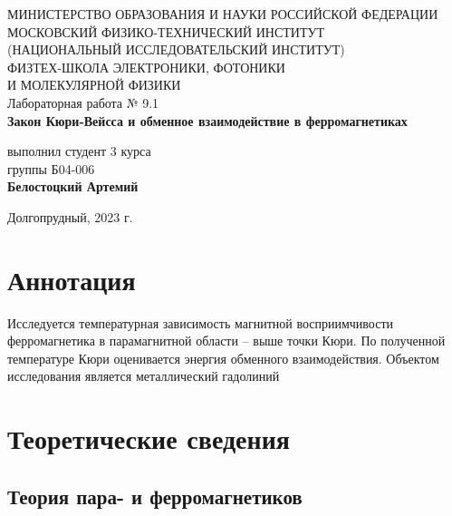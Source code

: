 \documentclass[a4paper,12pt]{article}
\begin{document}
 

\begin{titlepage}
	\begin{center}
		\large 	МИНИСТЕРСТВО ОБРАЗОВАНИЯ И НАУКИ РОССИЙСКОЙ ФЕДЕРАЦИИ\\
				МОСКОВСКИЙ ФИЗИКО-ТЕХНИЧЕСКИЙ ИНСТИТУТ \\
				(НАЦИОНАЛЬНЫЙ ИССЛЕДОВАТЕЛЬСКИЙ ИНСТИТУТ)\\ 
				ФИЗТЕХ-ШКОЛА ЭЛЕКТРОНИКИ, ФОТОНИКИ \\
				И МОЛЕКУЛЯРНОЙ ФИЗИКИ \\
		
		
		\vspace{4.0 cm}
		Лабораторная работа № 9.1 \\
		\LARGE \textbf{Закон Кюри-Вейсса и обменное взаимодействие в ферромагнетиках}
	\end{center}
	\vspace{3 cm} \large
	
	\begin{flushright}
		выполнил студент 3 курса \\
		{группы Б04-006}\\
		\textbf{Белостоцкий Артемий}\\
	\end{flushright}
	
	\vfill

	\begin{center}
	Долгопрудный, 2023 г.
	\end{center}
\end{titlepage}                                                                      

\section*{Аннотация}

Исследуется температурная зависимость магнитной восприимчивости ферромагнетика в парамагнитной области -- выше точки Кюри. По полученной температуре Кюри оценивается энергия обменного взаимодействия. Объектом исследования является металлический гадолиний

\section*{Теоретические сведения}

\subsection*{Теория пара- и ферромагнетиков}
\end{document}
